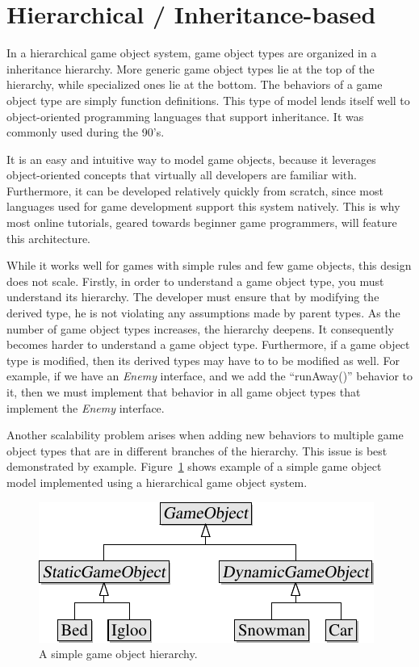 \documentclass[
    phd,
    electronic,
    letterpaper,
    simplechapterheading,
    openany,
    parttop,
    lof,
]{byumsphd}
\begin{document}
\section{Hierarchical / Inheritance-based}

In a hierarchical game object system, game object types are organized in a inheritance hierarchy. More generic game object types lie at the top of the hierarchy, while specialized ones lie at the bottom. The behaviors of a game object type are simply function definitions. This type of model lends itself well to object-oriented programming languages that support inheritance. It was commonly used during the 90's.

It is an easy and intuitive way to model game objects, because it leverages object-oriented concepts that virtually all developers are familiar with. Furthermore, it can be developed relatively quickly from scratch, since most languages used for game development support this system natively. This is why most online tutorials, geared towards beginner game programmers, will feature this architecture.

While it works well for games with simple rules and few game objects, this design does not scale. Firstly, in order to understand a game object type, you must understand its hierarchy. The developer must ensure that by modifying the derived type, he is not violating any assumptions made by parent types. As the number of game object types increases, the hierarchy deepens. It consequently becomes harder to understand a game object type. Furthermore, if a game object type is modified, then its derived types may have to to be modified as well. For example, if we have an \textit{Enemy} interface, and we add the ``runAway()'' behavior to it, then we must implement that behavior in all game object types that implement the \textit{Enemy} interface.

Another scalability problem arises when adding new behaviors to multiple game object types that are in different branches of the hierarchy. This issue is best demonstrated by example. Figure~\ref{fig:hierarchy:1} shows example of a simple game object model implemented using a hierarchical game object system.

\begin{figure}[H]
\bigskip
\centering
\includegraphics[width=0.8\linewidth]{hierarchy-uml-diagrams/hierarchy-1.pdf}
\caption{A simple game object hierarchy.}
\label{fig:hierarchy:1}
\end{figure}
\end{document}
